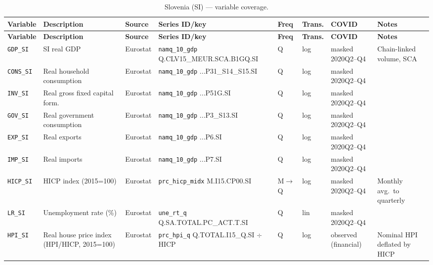 {\footnotesize
\begin{longtable}{@{}p{1.9cm}p{2.9cm}p{1.5cm}p{2.7cm}p{0.7cm}p{1.0cm}p{1.6cm}p{2.4cm}@{}}
\caption{Slovenia (SI) --- variable coverage.}\label{tab:data:SI}\\
\toprule
\textbf{Variable} & \textbf{Description} & \textbf{Source} & \textbf{Series ID/key} & \textbf{Freq} & \textbf{Trans.} & \textbf{COVID} & \textbf{Notes} \\
\midrule \endfirsthead
\toprule
\textbf{Variable} & \textbf{Description} & \textbf{Source} & \textbf{Series ID/key} & \textbf{Freq} & \textbf{Trans.} & \textbf{COVID} & \textbf{Notes} \\
\midrule \endhead
\bottomrule \endfoot
\texttt{GDP\_SI}      & SI real GDP                       & Eurostat & \texttt{namq\_10\_gdp} Q.\allowbreak CLV15\_MEUR.\allowbreak SCA.\allowbreak B1GQ.\allowbreak SI       & Q & log & masked 2020Q2--Q4 & Chain-linked volume, SCA \\
\texttt{CONS\_SI}     & Real household consumption        & Eurostat & \texttt{namq\_10\_gdp} ...P31\_S14\_S15.SI             & Q & log & masked 2020Q2--Q4 & \\
\texttt{INV\_SI}      & Real gross fixed capital form.    & Eurostat & \texttt{namq\_10\_gdp} ...P51G.SI                      & Q & log & masked 2020Q2--Q4 & \\
\texttt{GOV\_SI}      & Real government consumption       & Eurostat & \texttt{namq\_10\_gdp} ...P3\_S13.SI                   & Q & log & masked 2020Q2--Q4 & \\
\texttt{EXP\_SI}      & Real exports                      & Eurostat & \texttt{namq\_10\_gdp} ...P6.SI                        & Q & log & masked 2020Q2--Q4 & \\
\texttt{IMP\_SI}      & Real imports                      & Eurostat & \texttt{namq\_10\_gdp} ...P7.SI                        & Q & log & masked 2020Q2--Q4 & \\
\texttt{HICP\_SI}     & HICP index (2015=100)             & Eurostat & \texttt{prc\_hicp\_midx} M.I15.CP00.SI                 & M$\to$Q & log & masked 2020Q2--Q4 & Monthly avg.\ to quarterly \\
\texttt{LR\_SI}       & Unemployment rate (\%)            & Eurostat & \texttt{une\_rt\_q} Q.SA.TOTAL.PC\_ACT.T.SI            & Q & lin & masked 2020Q2--Q4 & \\
\texttt{HPI\_SI}      & Real house price index (HPI/HICP, 2015=100) & Eurostat & \texttt{prc\_hpi\_q} Q.TOTAL.I15\_Q.SI $\div$ HICP & Q & log & observed (financial) & Nominal HPI deflated by HICP \\

\end{longtable}}
